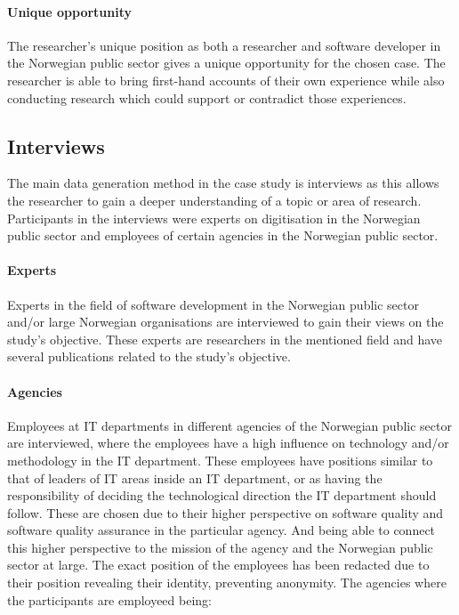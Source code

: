 \paragraph{Unique opportunity}
The researcher's unique position as both a researcher and software developer in the Norwegian public sector gives a unique opportunity for the chosen case. The researcher is able to bring first-hand accounts of their own experience while also conducting research which could support or contradict those experiences.

\subsection{Interviews}
The main data generation method in the case study is interviews as this allows the researcher to gain a deeper understanding of a topic or area of research. Participants in the interviews were experts on digitisation in the Norwegian public sector and employees of certain agencies in the Norwegian public sector. 

\paragraph{Experts}
Experts in the field of software development in the Norwegian public sector and/or large Norwegian organisations are interviewed to gain their views on the study's objective. These experts are researchers in the mentioned field and have several publications related to the study's objective.

\paragraph{Agencies}
Employees at IT departments in different agencies of the Norwegian public sector are interviewed, where the employees have a high influence on technology and/or methodology in the IT department. These employees have positions similar to that of leaders of IT areas inside an IT department, or as having the responsibility of deciding the technological direction the IT department should follow. These are chosen due to their higher perspective on software quality and software quality assurance in the particular agency. And being able to connect this higher perspective to the mission of the agency and the Norwegian public sector at large. The exact position of the employees has been redacted due to their position revealing their identity, preventing anonymity. The agencies where the participants are employeed being:

